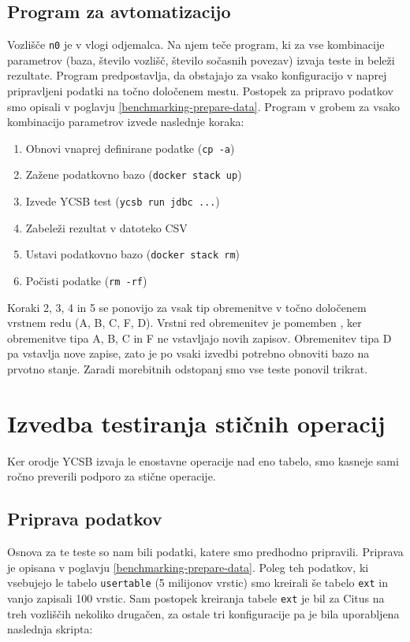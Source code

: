 \documentclass[a4paper, 12pt]{book}
\begin{document}
\subsection{Program za avtomatizacijo}
Vozlišče \texttt{n0} je v vlogi odjemalca. Na njem teče program, ki za vse kombinacije parametrov (baza, število vozlišč, število sočasnih povezav) izvaja teste in beleži rezultate. Program predpostavlja, da obstajajo za vsako konfiguracijo v naprej pripravljeni podatki na točno določenem mestu. Postopek za pripravo podatkov smo opisali v poglavju \ref{benchmarking-prepare-data}. Program v grobem za vsako kombinacijo parametrov izvede naslednje koraka:
\begin{enumerate}
    \item Obnovi vnaprej definirane podatke (\texttt{cp -a})
    \item Zažene podatkovno bazo (\texttt{docker stack up})
    \item Izvede YCSB test (\texttt{ycsb run jdbc ...})
    \item Zabeleži rezultat v datoteko CSV
    \item Ustavi podatkovno bazo (\texttt{docker stack rm})
    \item Počisti podatke (\texttt{rm -rf})
\end{enumerate}

\noindent Koraki 2, 3, 4 in 5 se ponovijo za vsak tip obremenitve v točno določenem vrstnem redu (A, B, C, F, D). Vrstni red obremenitev je pomemben \cite{YCSB-core-workloads}, ker obremenitve tipa A, B, C in F ne vstavljajo novih zapisov. Obremenitev tipa D pa vstavlja nove zapise, zato je po vsaki izvedbi potrebno obnoviti bazo na prvotno stanje. Zaradi morebitnih odstopanj smo vse teste ponovil trikrat.

\newpage
\section{Izvedba testiranja stičnih operacij}
Ker orodje YCSB izvaja le enostavne operacije nad eno tabelo, smo kasneje sami ročno preverili podporo za stične operacije.

\subsection{Priprava podatkov}
Osnova za te teste so nam bili podatki, katere smo predhodno pripravili. Priprava je opisana v poglavju \ref{benchmarking-prepare-data}. Poleg teh podatkov, ki vsebujejo le tabelo \texttt{usertable} (5 milijonov vrstic) smo kreirali še tabelo \texttt{ext} in vanjo zapisali 100 vrstic. Sam postopek kreiranja tabele \texttt{ext} je bil za Citus na treh vozliščih nekoliko drugačen, za ostale tri konfiguracije pa je bila uporabljena naslednja skripta:
\end{document}

